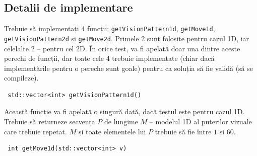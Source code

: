 \documentclass[12pt]{article}
\begin{document}
\subsection{Detalii de implementare}


Trebuie să implementați 4 funcții: \verb|getVisionPattern1d|, \verb|getMove1d|, \verb|getVisionPattern2d| și \verb|getMove2d|. Primele 2 sunt folosite pentru cazul 1D, iar celelalte 2 -- pentru cel 2D. În orice test, va fi apelată doar una dintre aceste perechi de funcții, dar toate cele 4 trebuie implementate (chiar dacă implementările pentru o pereche sunt goale) pentru ca soluția să fie validă (să se compileze).

\begin{lstlisting}
 std::vector<int> getVisionPattern1d()
\end{lstlisting}


Această funcție va fi apelată o singură dată, dacă testul este pentru cazul 1D. Trebuie să returneze secvența $P$ de lungime $M$ -- modelul 1D al puterilor vizuale care trebuie repetat. $M$ și toate elementele lui $P$ trebuie să fie între $1$ și $60$.

\begin{lstlisting}
 int getMove1d(std::vector<int> v)
\end{lstlisting}

\end{document}
